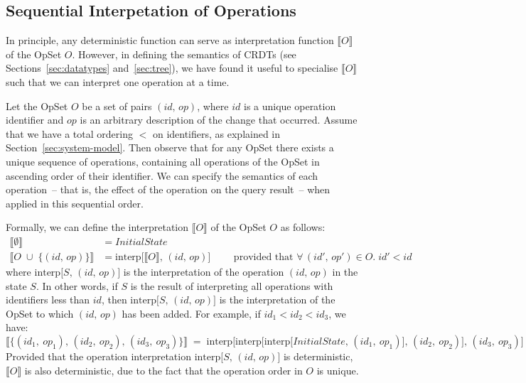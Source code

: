 \subsection{Sequential Interpetation of Operations}\label{sec:op-serial}

In principle, any deterministic function can serve as interpretation function $\llbracket O \rrbracket$ of the OpSet $O$.
However, in defining the semantics of CRDTs (see Sections~\ref{sec:datatypes} and~\ref{sec:tree}), we have found it useful to specialise $\llbracket O \rrbracket$ such that we can interpret one operation at a time.

Let the OpSet $O$ be a set of pairs $(\mathit{id},\, \mathit{op})$, where $\mathit{id}$ is a unique operation identifier and $\mathit{op}$ is an arbitrary description of the change that occurred.
Assume that we have a total ordering $<$ on identifiers, as explained in Section~\ref{sec:system-model}.
Then observe that for any OpSet there exists a unique sequence of operations, containing all operations of the OpSet in ascending order of their identifier.
We can specify the semantics of each operation~-- that is, the effect of the operation on the query result~-- when applied in this sequential order.

Formally, we can define the interpretation $\llbracket O \rrbracket$ of the OpSet $O$ as follows:
\begin{align*}
    \big\llbracket \emptyset \big\rrbracket &= \mathit{InitialState} \\
    \big\llbracket O \;\cup\; \{(\mathit{id},\, \mathit{op})\} \big\rrbracket &=
    \mathrm{interp}\big[\llbracket O \rrbracket,\, (\mathit{id},\, \mathit{op})\big]
    \qquad\text{ provided that } \forall\,(\mathit{id}',\, \mathit{op}') \in O.\; \mathit{id}' < \mathit{id}
\end{align*}
where $\mathrm{interp}\big[S,\, (\mathit{id},\, \mathit{op})\big]$ is the interpretation of the operation $(\mathit{id},\, \mathit{op})$ in the state $S$.
In other words, if $S$ is the result of interpreting all operations with identifiers less than $\mathit{id}$, then
$\mathrm{interp}\big[S,\, (\mathit{id},\, \mathit{op})\big]$ is the interpretation of the OpSet to which $(\mathit{id},\, \mathit{op})$ has been added.
For example, if $\mathit{id}_1 < \mathit{id}_2 < \mathit{id}_3$, we have:
\[ \big\llbracket \{(\mathit{id}_1,\ \mathit{op}_1),\,
    (\mathit{id}_2,\ \mathit{op}_2),\,
    (\mathit{id}_3,\ \mathit{op}_3)\} \big\rrbracket \;=\;
    \mathrm{interp}\big[\mathrm{interp}\big[\mathrm{interp}\big[\mathit{InitialState},\,
    (\mathit{id}_1,\ \mathit{op}_1)\big],\,
    (\mathit{id}_2,\ \mathit{op}_2)\big],\,
    (\mathit{id}_3,\ \mathit{op}_3)\big] \]
Provided that the operation interpretation $\mathrm{interp}\big[S,\, (\mathit{id},\, \mathit{op})\big]$ is deterministic, $\llbracket O \rrbracket$ is also deterministic, due to the fact that the operation order in $O$ is unique.

